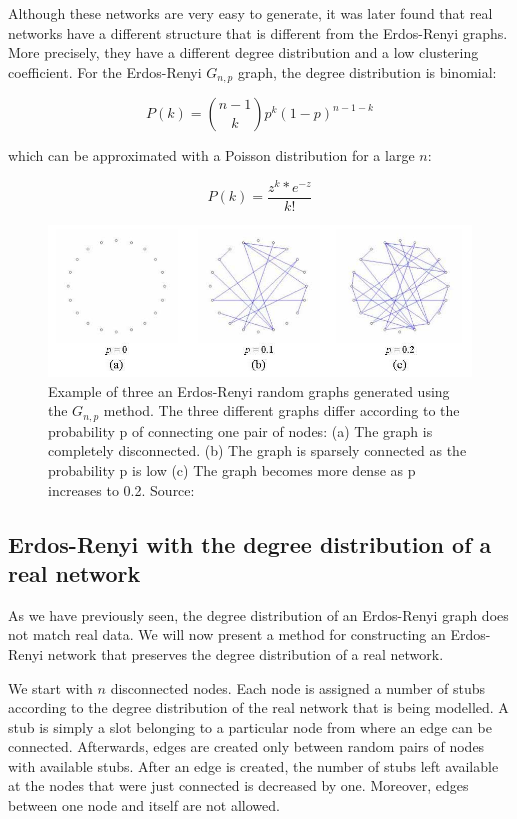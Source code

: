Although these networks are very easy to generate, it was later found
that real networks have a different structure that is different from the
Erdos-Renyi graphs. More precisely, they have a different degree distribution
and a low clustering coefficient. For the Erdos-Renyi $ G_{n,p} $ graph, the
degree distribution is binomial:

\begin{equation}
 P(k) = {n-1 \choose k} p^k (1-p)^{n-1-k}
\end{equation}

which can be approximated with a Poisson distribution for a large $n$:

\begin{equation}
 P(k) = \frac{z^k * e^{-z}}{k!}
\end{equation}

\begin{figure}[h]
  \centering
\includegraphics[scale=0.5]{images/erdos-renyi.jpg}
\caption{Example of three an Erdos-Renyi random graphs generated using the
\(G_{n,p}\) method. The three different graphs differ according to the
probability p of connecting one pair of nodes: (a) The graph is completely
disconnected. (b) The graph is sparsely connected as the probability p is low
(c) The graph becomes more dense as p increases to 0.2.
Source:\cite{erd6s1960evolution}}
\label{fig:erdos_renyi_graphs}
\end{figure}

\subsection{Erdos-Renyi with the degree distribution of a real network}

As we have previously seen, the degree distribution of an Erdos-Renyi graph
does not match real data. We will now present a method for constructing an
Erdos-Renyi network that preserves the degree distribution of a real network. 

We start with $n$ disconnected nodes. Each node is assigned a number of stubs 
according to the degree distribution of the real network that is being
modelled. A stub is simply a slot belonging to a particular node from where an edge can 
be connected. Afterwards, edges are created only between random pairs of nodes with
available stubs. After an edge is created, the number of stubs left available
at the nodes that were just connected is decreased by one. Moreover, edges
between one node and itself are not allowed.

